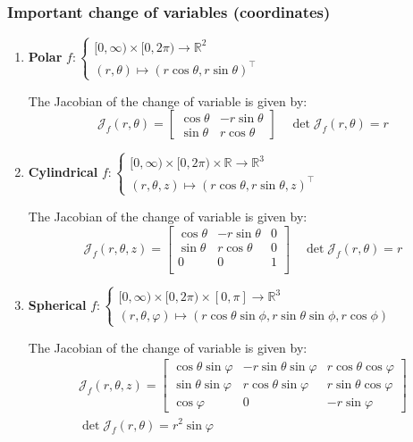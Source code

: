 \documentclass[a4paper, 10pt]{article}
\theoremstyle{definition}
\newcommand{\R}{\mathbb{R}}
\newcommand{\J}{\mathcal{J}}
\begin{document}
\subsubsection{Important change of variables (coordinates)}
\begin{enumerate}[leftmargin=0pt]
    \item \textbf{Polar}  \(f :\begin{cases}
        [0, \infty) \times [0, 2\pi) \to \R^2 \\
        (r, \theta) \mapsto (r \cos \theta, r \sin \theta)^\top
    \end{cases}\)
    
    The Jacobian of the change of variable is given by:
    \[\J_f(r, \theta) = \begin{bmatrix}
        \cos \theta & -r \sin \theta \\
        \sin \theta & r \cos \theta
    \end{bmatrix} \quad \det \J_f(r, \theta) = r\]

    \item \textbf{Cylindrical}  \(f :\begin{cases}
        [0, \infty) \times [0, 2\pi) \times \R \to \R^3 \\
        (r, \theta, z) \mapsto (r \cos \theta, r \sin \theta, z)^\top
    \end{cases}\)
    
    The Jacobian of the change of variable is given by:
    \[\J_f(r, \theta, z) = \begin{bmatrix}
        \cos \theta & -r \sin \theta & 0\\
        \sin \theta & r \cos \theta & 0 \\
        0 & 0 & 1 \\
    \end{bmatrix} \quad \det \J_f(r, \theta) = r\]

    \item \textbf{Spherical} \(f :\begin{cases}
        [0, \infty) \times [0, 2\pi) \times [0, \pi] \to \R^3 \\
        (r, \theta, \varphi) \mapsto (r \cos \theta \sin \phi, r \sin \theta \sin \phi, r \cos \phi)
    \end{cases}\)
    
    The Jacobian of the change of variable is given by:
    \begin{gather*}
        \J_f(r, \theta, z) = \begin{bmatrix}
            \cos \theta \sin \varphi & -r \sin \theta \sin \varphi & r \cos \theta \cos \varphi \\
            \sin \theta \sin \varphi & r \cos \theta \sin \varphi & r \sin \theta \cos \varphi \\
            \cos \varphi & 0 & -r \sin \varphi
        \end{bmatrix} \\
        \det \J_f(r, \theta) = r^2 \sin \varphi
    \end{gather*}
\end{enumerate}
\end{document}
